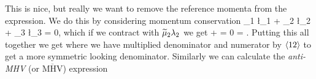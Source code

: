 This is nice, but really we want to remove the reference momenta from the expression. We do this by considering momentum conservation 
\bse 
    \widetilde{\l}_1 \l_1  +  \widetilde{\l}_2 \l_2 +  \widetilde{\l}_3 \l_3 = 0,
\ese 
which if we contract with $\widetilde{\mu}_2\lambda_2$ we get 
\be 
\label{eqn:3q21q2}
     \ra [1q_2] +  \ra [3 q_2] = 0 \qquad \implies \qquad \frac{[3q_2]}{[1q_2]} = \frac{\la 12\ra }{\la 23 \ra}. 
\ee 
Putting this all together we get 
\noindent where we have multiplied denominator and numerator by $\langle 12\rangle$ to get a more symmetric looking denominator. Similarly we can calculate the \textit{anti-MHV} (or $\overline{\text{MHV}}$) expression 


